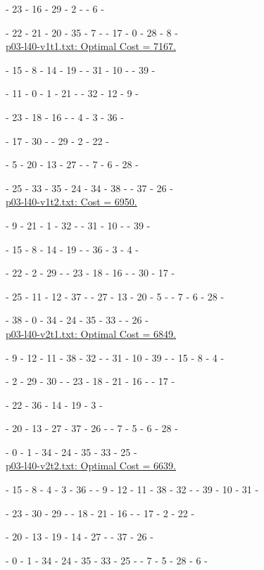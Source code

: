 \te - 23 - 16 - 29 - 2 - \te - 6 - \te 

\te - 22 - 21 - 20 - 35 - 7 - \te - 17 - 0 - 28 - 8 - \te 
\\
  
\underline{p03-l40-v1t1.txt: Optimal Cost =  7167.} 

\ta - 15 - 8 - 14 - 19 - \ta - 31 - 10 - \ta - 39 - \ta 

\ta - 11 - 0 - 1 - 21 - \ta - 32 - 12 - 9 - \ta 

\tc - 23 - 18 - 16 - \tc - 4 - 3 - 36 - \tc 

\tc - 17 - 30 - \tc - 29 - 2 - 22 - \tc 

\te - 5 - 20 - 13 - 27 - \te - 7 - 6 - 28 - \te 

\te - 25 - 33 - 35 - 24 - 34 - 38 - \te - 37 - 26 - \te 
\\

\underline{p03-l40-v1t2.txt: Cost = 6950.} 

\ta - 9 - 21 - 1 - 32 - \ta - 31 - 10 - \ta - 39 - \ta 

\ta - 15 - 8 - 14 - 19 - \ta - 36 - 3 - 4 - \ta 

\tc - 22 - 2 - 29 - \tc - 23 - 18 - 16 - \tc - 30 - 17 - \tc 

\te - 25 - 11 - 12 - 37 - \te - 27 - 13 - 20 - 5 - \te - 7 - 6 - 28 - \te 

\te - 38 - 0 - 34 - 24 - 35 - 33 - \te - 26 - \te 
\\

\underline{p03-l40-v2t1.txt: Optimal Cost = 6849.} 

\ta - 9 - 12 - 11 - 38 - 32 - \ta - 31 - 10 - 39 - \ta - 15 - 8 - 4 - \ta 

\tc - 2 - 29 - 30 - \tc - 23 - 18 - 21 - 16 - \tc - 17 - \tc 

\tc - 22 - 36 - 14 - 19 - 3 - \tc 

\te - 20 - 13 - 27 - 37 - 26 - \te - 7 - 5 - 6 - 28 - \te

\te - 0 - 1 - 34 - 24 - 35 - 33 - 25 - \te
\\

\underline{p03-l40-v2t2.txt: Optimal Cost =  6639.} 

\ta - 15 - 8 - 4 - 3 - 36 - \ta - 9 - 12 - 11 - 38 - 32 - \ta - 39 - 10 - 31 - \ta 

\tc - 23 - 30 - 29 - \tc - 18 - 21 - 16 - \tc - 17 - 2 - 22 - \tc 

\te - 20 - 13 - 19 - 14 - 27 - \te - 37 - 26 - \te 

\te - 0 - 1 - 34 - 24 - 35 - 33 - 25 - \te - 7 - 5 - 28 - 6 - \te 
\\

